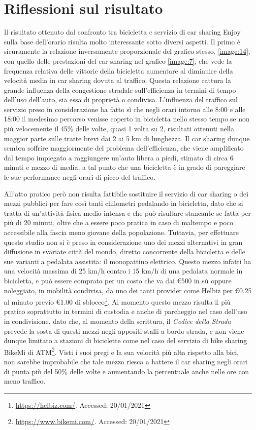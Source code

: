 \section{Riflessioni sul risultato}

Il risultato ottenuto dal confronto tra bicicletta e servizio di car sharing Enjoy sulla base dell'orario risulta molto interessante sotto diversi aspetti. Il primo è sicuramente la relazione inversamente proporzionale del grafico stesso, \ref{image:14}, con quello delle prestazioni del car sharing nel grafico \ref{image:7}, che vede la frequenza relativa delle vittorie della bicicletta aumentare al diminuire della velocità media in car sharing dovuta al traffico. Questa relazione cattura la grande influenza della congestione stradale sull'efficienza in termini di tempo dell'uso dell'auto, sia essa di proprietà o condivisa. L'influenza del traffico sul servizio preso in considerazione ha fatto sì che negli orari intorno alle 8:00 e alle 18:00 il medesimo percorso venisse coperto in bicicletta nello stesso tempo se non più velocemente il 45\% delle volte, quasi 1 volta su 2, risultati ottenuti nella maggior parte sulle tratte brevi dai 2 ai 5 km di lunghezza. Il car sharing dunque sembra soffrire maggiormente del problema dell'efficienza, che viene amplificato dal tempo impiegato a raggiungere un'auto libera a piedi, stimato di circa 6 minuti e mezzo di media, a tal punto che una bicicletta è in grado di pareggiare le sue performance negli orari di picco del traffico.

All'atto pratico però non risulta fattibile sostituire il servizio di car sharing o dei mezzi pubblici per fare così tanti chilometri pedalando in bicicletta, dato che si tratta di un'attività fisica medio-intensa e che può risultare stancante se fatta per più di 20 minuti, oltre che a essere poco pratica in caso di maltempo e poco accessibile alla fascia meno giovane della popolazione. Tuttavia, per effettuare questo studio non si è preso in considerazione uno dei mezzi alternativi in gran diffusione in svariate città del mondo, diretto concorrente della bicicletta e delle sue varianti a pedalata assistita: il monopattino elettrico. Questo mezzo infatti ha una velocità massima di 25 km/h contro i 15 km/h di una pedalata normale in bicicletta, e può essere comprato per un costo che va dai €500 in sù oppure noleggiato, in mobilità condivisa, da uno dei tanti provider come Helbiz per €0.25 al minuto previo €1.00 di sblocco\footnote{\url{https://helbiz.com/}. Accessed: 20/01/2021}. Al momento questo mezzo risulta il più pratico soprattutto in termini di custodia e anche di parcheggio nel caso dell'uso in condivisione, dato che, al momento della scrittura, il \textit{Codice della Strada} prevede la sosta di questi mezzi negli appositi stalli a bordo strada, e non viene dunque limitato a stazioni di biciclette come nel caso del servizio di bike sharing BikeMi di ATM\footnote{\url{https://www.bikemi.com/}. Accessed: 20/01/2021}. Visti i suoi pregi e la sua velocità più alta rispetto alla bici, non sarebbe improbabile che tale mezzo riesca a battere il car sharing negli orari di punta più del 50\% delle volte e aumentando la percentuale anche nelle ore con meno traffico.

